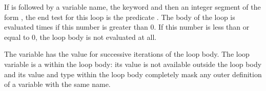 {%

If 
is followed by a variable name, the 
keyword and then an integer segment of the form ,
the end test for this loop is the predicate .
The body of the loop is evaluated  times if this
number is greater than 0.
If this number is less than or equal to 0, the loop body is not evaluated
at all.

The variable  has the value
 for successive iterations
of the loop body.
The loop variable is a 
within the loop body: its value is not available outside the loop body
and its value and type within the loop body completely mask any outer
definition of a variable with the same name.

}
